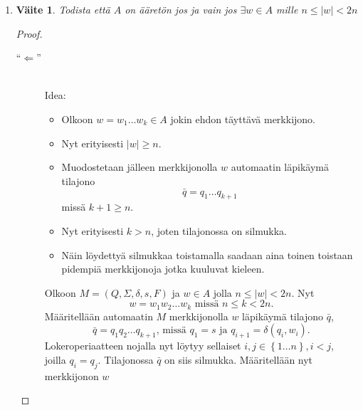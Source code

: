 \documentclass[a4paper,11pt,draft]{article}
\newtheorem*{claim}{Väite}
\newcommand{\set}[1]{{\left\{ #1 \right\}}}
\begin{document}
\begin{enumerate}
\begin{enumerate}
\begin{proof}
\begin{description}
      \end{description}
    \end{proof}
  \item
    \begin{claim}
      Todista että $A$ on ääretön jos ja vain jos $\exists w \in A$
      mille $n \le |w| < 2n$
    \end{claim}
    \begin{proof} \hfill \\
      \begin{description}
        \item[``$\Leftarrow$''] \hfill \\
          Idea:
          \begin{itemize}
            \item Olkoon $w = w_1 \ldots w_k \in A$ jokin ehdon
              täyttävä merkkijono.
            \item Nyt erityisesti $|w| \ge n$.
            \item Muodostetaan jälleen merkkijonolla $w$ automaatin
              läpikäymä tilajono
              \begin{equation*}
                \bar{q} = q_1 \ldots q_{k+1}
              \end{equation*}
              missä
              $k+1 \ge n$.
            \item Nyt erityisesti $k > n$, joten tilajonossa on
              silmukka.
            \item Näin löydettyä silmukkaa toistamalla saadaan aina
              toinen toistaan pidempiä merkkijonoja jotka kuuluvat kieleen.
          \end{itemize}
          Olkoon $M = (Q, \Sigma, \delta, s, F)$ ja $w \in A$ jolla $n
          \le |w| < 2n$. Nyt
          \begin{equation*}
            w = w_1w_2 \ldots w_k \textrm{ missä } n \le k < 2n \textrm{.}
          \end{equation*}
          Määritellään automaatin $M$ merkkijonolla $w$ läpikäymä
          tilajono $\bar{q}$,
          \begin{equation*}
            \bar{q} = q_1q_2 \ldots q_{k+1}
            \textrm{, missä } q_1 = s
            \textrm{ ja } q_{i+1} = \delta(q_i, w_i) \textrm{.}
          \end{equation*}
          Lokeroperiaatteen nojalla nyt löytyy sellaiset $i,j \in
          \set{1 \ldots n}, i < j$, joilla $q_i = q_j$. Tilajonossa
          $\bar{q}$ on siis silmukka. Määritellään nyt merkkijonon $w$

\end{description}
\end{proof}
\end{enumerate}
\end{enumerate}
\end{document}
